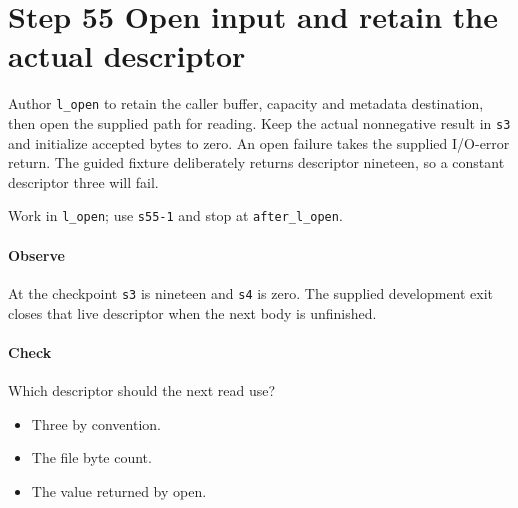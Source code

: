 \section{Step 55 Open input and retain the actual descriptor}\label{qoi-s55}
Author \texttt{l\_open} to retain the caller buffer, capacity and metadata destination, then open the supplied path for reading. Keep the actual nonnegative result in \texttt{s3} and initialize accepted bytes to zero. An open failure takes the supplied I/O-error return. The guided fixture deliberately returns descriptor nineteen, so a constant descriptor three will fail.

Work in \texttt{l\_open}; use \texttt{s55-1} and stop at \texttt{after\_l\_open}.

\paragraph{Observe} At the checkpoint \texttt{s3} is nineteen and \texttt{s4} is zero. The supplied development exit closes that live descriptor when the next body is unfinished.

\paragraph{Check} Which descriptor should the next read use?
\begin{itemize}
  \item[A.] Three by convention.
  \item[B.] The file byte count.
  \item[C.] The value returned by open.
\end{itemize}
